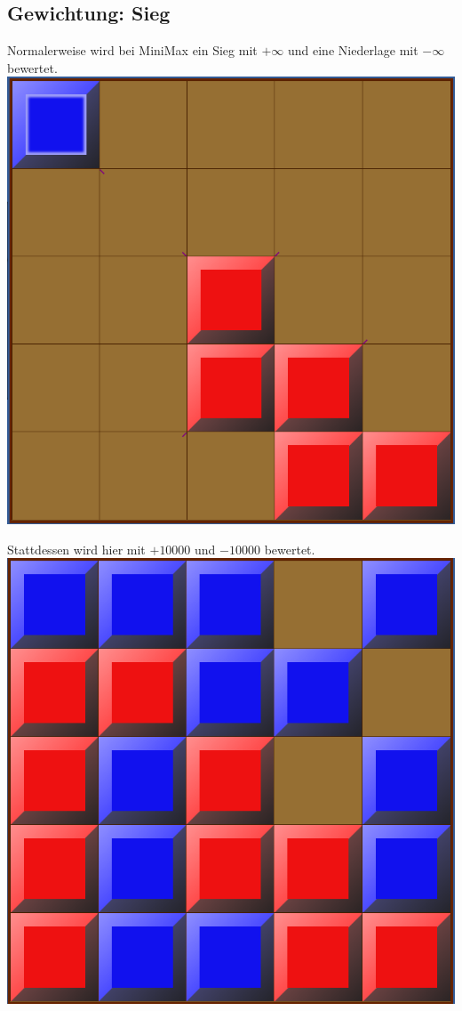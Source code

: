 \documentclass[12pt]{beamer}
\begin{document}
\subsection{Gewichtung: Sieg}
\begin{frame}
Normalerweise wird bei MiniMax ein Sieg mit $+\infty$ und eine Niederlage mit $-\infty$ bewertet.
\pause
\includegraphics[width=0.6\linewidth]{media/wgh22.png}
\end{frame}
\begin{frame}
Stattdessen wird hier mit $+10000$ und $-10000$ bewertet.
\pause
\includegraphics[width=0.6\linewidth]{media/wgh23.png}
\end{frame}
\end{document}
